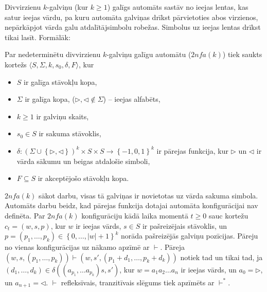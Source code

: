 \documentclass{ludis}
\begin{document}
Divvirzienu $k$-galviņu (kur $k\geq 1$) galīgs automāts sastāv no ieejas lentas, kas satur ieejas vārdu, pa kuru automāta galviņas drīkst pārvietoties abos virzienos, nepārkāpjot vārda galu atdalītājsimbolu  robežas. Simbolus uz ieejas lentas drīkst tikai lasīt. Formālāk:
\begin{definicija}
Par nedeterminētu divvirzienu $k$-galviņu galīgu automātu ($2nfa(k)$) tiek saukts kortežs $\langle S, \Sigma, k, s_0, \delta, F \rangle$, kur
\begin{itemize}
	\item $S$ ir galīga stāvokļu kopa,
	\item $\Sigma$ ir galīga kopa, ($ \triangleright,\triangleleft \notin \Sigma$) -- ieejas alfabēts,
	\item $k\geq 1$ ir galviņu skaits, 
	\item $s_0\in S$ ir sakuma stāvoklis,
	\item $\delta: \left( \Sigma \cup \left\{ \triangleright, \triangleleft \right\} \right)^k \times S \times S \rightarrow \left\{-1,0,1\right\}^k$ ir pārejas funkcija, kur $\triangleright$ un $\triangleleft$ ir vārda sākumu un beigas atdalošie simboli,
	\item $F \subseteq S$ ir akceptējošo stāvokļu kopa.
\end{itemize}
\end{definicija}
$2nfa(k)$ sākot darbu, visas tā galviņas ir novietotas uz vārda sakuma simbola. Automāts darbu beidz, kad pārejas funkcija dotajai automāta konfigurācijai nav definēta. Par $2nfa(k)$ konfigurāciju kādā laika momentā $t\geq 0$ sauc kortežu $c_t=\left(w,s,p\right)$, kur $w$ ir ieejas vārds, $s\in S$ ir pašreizējais stāvoklis, un
$p = \left( p_1, \ldots, p_k \right) \in \left\{ 0, \ldots, |w| +1 \right\}^k $
norāda pašreizējās galviņu pozīcijas. Pāreju no vienas konfigurācijas uz nākamo apzīmē ar $\vdash$. Pāreja
$\left( w, s, \left( p_1, \ldots, p_k \right) \right) \vdash \left( w, s', \left( p_1+d_1, \ldots, p_k+d_k \right) \right)$
notiek tad un tikai tad, ja
$\left(d_1, \ldots, d_k \right) \in \delta \left( \left( a_{p_1}, \ldots a_{p_k} \right) s, s' \right)$,
kur $w = a_1a_2 \ldots a_n$ ir ieejas vārds, un $a_0=\triangleright$, un $a_{n+1}=\triangleleft$. $\vdash$ refleksīvais, tranzitīvais slēgums tiek apzīmēts ar $\vdash^*$.
\end{document}
